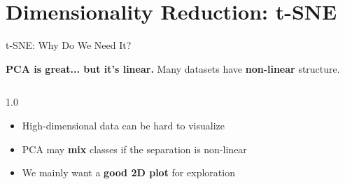 \section{Dimensionality Reduction: t-SNE}

\begin{frame}{t-SNE: Why Do We Need It?}

\textbf{PCA is great... but it's linear.} Many datasets have \textbf{non-linear} structure.

\vspace{0.8em}
\begin{columns}[c]
\begin{column}{1.0\textwidth}
\begin{tcolorbox}[colback=blue!5, colframe=blue!50, title=\textbf{Problem}]
\begin{itemize}
\item High-dimensional data can be hard to visualize
\item PCA may \textbf{mix} classes if the separation is non-linear
\item We mainly want a \textbf{good 2D plot} for exploration
\end{itemize}
\end{tcolorbox}
\end{column}
\end{columns}

\end{frame}


